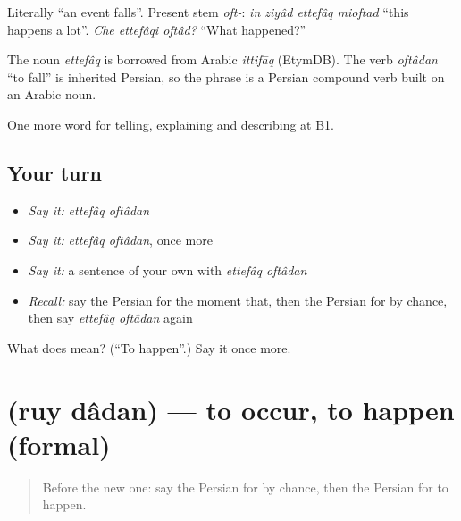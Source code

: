 Literally \textquotedblleft{}an event falls\textquotedblright{}. Present stem \emph{oft-}: \emph{in ziyâd ettefâq mioftad} \textquotedblleft{}this happens a lot\textquotedblright{}. \emph{Che ettefâqi oftâd?} \textquotedblleft{}What happened?\textquotedblright{}

\begin{cousinweb}
The noun \emph{ettefâq} is borrowed from Arabic \emph{ittifāq} (EtymDB). The verb \emph{oftâdan} \textquotedblleft{}to fall\textquotedblright{} is inherited Persian, so the phrase is a Persian compound verb built on an Arabic noun.
\end{cousinweb}

\begin{grammarlens}[title={What you've built}]
One more word for telling, explaining and describing at B1.
\end{grammarlens}

\subsection*{Your turn}
\begin{itemize}
\raggedright
  \item \emph{Say it:} \emph{ettefâq oftâdan}
  \item \emph{Say it:} \emph{ettefâq oftâdan}, once more
  \item \emph{Say it:} a sentence of your own with \emph{ettefâq oftâdan}
  \item \emph{Recall:} say the Persian for the moment that, then the Persian for by chance, then say \emph{ettefâq oftâdan} again
\end{itemize}

\begin{tcolorbox}[breakable,colback=teal!4,colframe=teal!35!black,title={Before you move on}]
What does   mean? (\textquotedblleft{}To happen\textquotedblright{}.) Say it once more.
\end{tcolorbox}
\section[\texorpdfstring{\fa{روی} \fa{دادن} (ruy dâdan)}{روی دادن (ruy dâdan)}]{  (ruy dâdan) — to occur, to happen (formal)}

\label{lesson:FA-C301-ruy-dadan}



\begin{quote}
Before the new one: say the Persian for by chance, then the Persian for to happen.
\end{quote}

